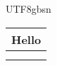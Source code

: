 \documentclass{article}
\newcommand{\myfont}{gbsn} %
\begin{document}
 
\begin{CJK}{UTF8}{\myfont} 

\Huge
\begin{tabular}{|l|l|} \hline
\multicolumn{2}{|l|}{Hello} \\ \hline
 & \\ \hline
 & \\ \hline
\end{tabular}

\end{CJK} 
\end{document}
